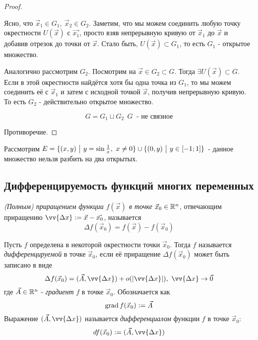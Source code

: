 \begin{proof}
\begin{itemize}
		 Ясно, что $\vec{x}_1 \in G_1,\ \vec{x}_2 \in G_2$. Заметим, что мы можем соединить любую точку окрестности $U(\vec{x})$ с $\vec{x_1}$, просто взяв непрерывную кривую от $\vec{x}_1$ до $\vec{x}$ и добавив отрезок до точки от $\vec{x}$. Стало быть, $U(\vec{x}) \subset G_1$, то есть $G_1$ - открытое множество.
		 
		 Аналогично рассмотрим $G_2$. Посмотрим на  $\vec{x} \in G_2 \subset G$. Тогда $\exists U(\vec{x}) \subset G$. Если в этой окрестности найдётся хотя бы одна точка из $G_1$, то мы можем соединить её с $\vec{x}_1$ и затем с исходной точкой $\vec{x}$, получив непрерывную кривую. То есть $G_2$ - действительно открытое множество.
		 
		 \[
		  G = G_1 \sqcup G_2 \ \ G \ \text{ - не связное}
		 \]
	\end{itemize}
	Противоречие.
\end{proof}

\begin{example}
	Рассмотрим $E = \{(x, y) \ \big|\  y = \sin \frac{1}{x},\ x \neq 0\} \cup \{(0, y) \ \big|\  y \in [-1; 1]\}$ - данное множество нельзя разбить на два открытых.
\end{example}

\subsection{Дифференцируемость функций многих переменных}

\begin{definition}
	\textit{(Полным) приращением функции $f(\vec{x})$ в точке} $\vec{x}_0 \in \mathbb{R}^n$, отвечающим приращению $\vv{\Delta x} := \vec{x} - \vec{x_0}$, называется
	\[
		\Delta f(\vec{x}_0) = f(\vec{x}) - f(\vec{x}_0)
	\]
\end{definition}

\begin{definition}
	Пусть $f$ определена в некоторой окрестности точки $\vec{x}_0$. Тогда $f$ называется \textit{дифференцируемой} в точке $\vec{x}_0$, если её приращение $\Delta f(\vec{x}_0)$ может быть записано в виде
	\[
		\Delta f(\vec{x}_0) = (\vec{A}, \vv{\Delta x}) + o(|\vv{\Delta x}|),\ \vv{\Delta x} \to \vec{0}
	\]
	где $\vec{A} \in \mathbb{R}^n$ - \textit{градиент} $f$ в точке $\vec{x}_0$. Обозначается как
	\[
		\operatorname{grad} f(\vec{x}_0) := \vec{A}
	\]
	Выражение $(\vec{A}, \vv{\Delta x})$ называется \textit{дифференциалом} функции $f$ в точке $\vec{x}_0$:
	\[
		df(\vec{x}_0) := (\vec{A}, \vv{\Delta x})
	\]
\end{definition}

